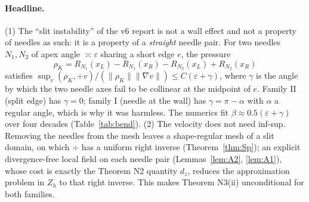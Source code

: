 \documentclass[11pt]{article}
\theoremstyle{remark}
\newcommand{\norm}[1]{\|#1\|}
\begin{document}
\paragraph{Headline.} (1) The ``slit instability'' of the v6 report is not a wall effect and not a property of
needles as such: it is a property of a \emph{straight} needle pair. For two needles $N_1,N_2$ of apex angle $\asymp\varepsilon$
sharing a short edge $e$, the pressure
\[
\rho_K=R_{N_1}(x_L)-R_{N_1}(x_R)-R_{N_2}(x_L)+R_{N_2}(x_R)
\]
satisfies $\sup_v(\rho_K,\div v)/(\norm{\rho_K}\norm{\nabla v})\le C(\varepsilon+\gamma)$, where $\gamma$ is the angle by which the two
needle axes fail to be collinear at the midpoint of $e$. Family II (split edge) has $\gamma=0$; family I (needle at the wall)
has $\gamma=\pi-\alpha$ with $\alpha$ a regular angle, which is why it was harmless. The numerics fit $\beta\approx0.5(\varepsilon+\gamma)$
over four decades (Table~\ref{tab:bend}).
(2) The velocity does not need inf-sup. Removing the needles from the mesh leaves a shape-regular mesh of a slit domain, on
which $\div$ has a uniform right inverse (Theorem~\ref{thm:Sp}); an explicit divergence-free local field on each needle pair
(Lemmas~\ref{lem:A2}, \ref{lem:A1}), whose cost is exactly the Theorem N2 quantity $d_z$, reduces the approximation problem in
$Z_h$ to that right inverse. This makes Theorem N3(ii) unconditional for both families.
\end{document}
